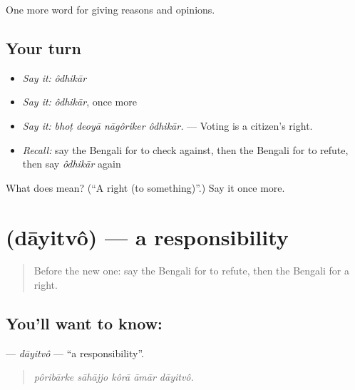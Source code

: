 \begin{grammarlens}[title={What you've built}]
One more word for giving reasons and opinions.
\end{grammarlens}

\subsection*{Your turn}
\begin{itemize}
\raggedright
  \item \emph{Say it:} \emph{ôdhikār}
  \item \emph{Say it:} \emph{ôdhikār}, once more
  \item \emph{Say it:} \emph{bhoṭ deoyā nāgôriker ôdhikār.} — Voting is a citizen's right.
  \item \emph{Recall:} say the Bengali for to check against, then the Bengali for to refute, then say \emph{ôdhikār} again
\end{itemize}

\begin{tcolorbox}[breakable,colback=teal!4,colframe=teal!35!black,title={Before you move on}]
What does  mean? (\textquotedblleft{}A right (to something)\textquotedblright{}.) Say it once more.
\end{tcolorbox}
\section[\texorpdfstring{\bn{দায়িত্ব} (dāyitvô)}{দায়িত্ব (dāyitvô)}]{ (dāyitvô) — a responsibility}

\label{lesson:BN-C339-dayitvo}



\begin{quote}
Before the new one: say the Bengali for to refute, then the Bengali for a right.
\end{quote}

\subsection*{You'll want to know: }
\textbf{} — \emph{dāyitvô} — \textquotedblleft{}a responsibility\textquotedblright{}.

\begin{quote}
    
\end{quote}

\begin{quote}
\emph{pôribārke sāhājjo kôrā āmār dāyitvô.}
\end{quote}


